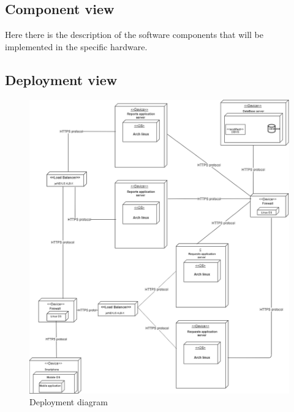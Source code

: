 \documentclass[titlepage]{article}
\begin{document}
\subsection{Component view}
Here there is the description of the software components that will be implemented in the specific hardware.
\subsection{Deployment view}
\begin{figure}[h]
	\includegraphics[scale=0.465]{Diagrams/Deployment diagram.png}
	\caption{Deployment diagram}
\end{figure}
\FloatBarrier
\end{document}

